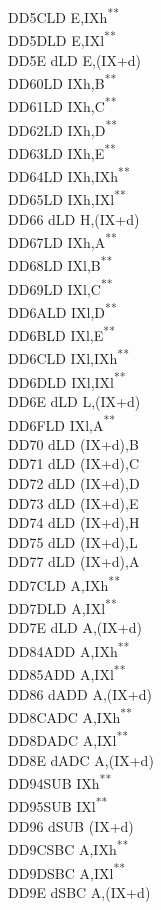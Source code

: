 \documentclass[12pt,twoside,openright,a4paper]{book}
\newcommand{\UNDOC}{\textnormal{\textsuperscript{**}}}
\begin{document}
\begin{multicols}{3}
{\begin{tabbing}
	DD5C\>LD E,IXh\UNDOC\\
	DD5D\>LD E,IXl\UNDOC\\
	DD5E d\>LD E,(IX+d)\\
	DD60\>LD IXh,B\UNDOC\\
	DD61\>LD IXh,C\UNDOC\\
	DD62\>LD IXh,D\UNDOC\\
	DD63\>LD IXh,E\UNDOC\\
	DD64\>LD IXh,IXh\UNDOC\\
	DD65\>LD IXh,IXl\UNDOC\\
	DD66 d\>LD H,(IX+d)\\
	DD67\>LD IXh,A\UNDOC\\
	DD68\>LD IXl,B\UNDOC\\
	DD69\>LD IXl,C\UNDOC\\
	DD6A\>LD IXl,D\UNDOC\\
	DD6B\>LD IXl,E\UNDOC\\
	DD6C\>LD IXl,IXh\UNDOC\\
	DD6D\>LD IXl,IXl\UNDOC\\
	DD6E d\>LD L,(IX+d)\\
	DD6F\>LD IXl,A\UNDOC\\
	DD70 d\>LD (IX+d),B\\
	DD71 d\>LD (IX+d),C\\
	DD72 d\>LD (IX+d),D\\
	DD73 d\>LD (IX+d),E\\
	DD74 d\>LD (IX+d),H\\
	DD75 d\>LD (IX+d),L\\
	DD77 d\>LD (IX+d),A\\
	DD7C\>LD A,IXh\UNDOC\\
	DD7D\>LD A,IXl\UNDOC\\
	DD7E d\>LD A,(IX+d)\\
	DD84\>ADD A,IXh\UNDOC\\
	DD85\>ADD A,IXl\UNDOC\\
	DD86 d\>ADD A,(IX+d)\\
	DD8C\>ADC A,IXh\UNDOC\\
	DD8D\>ADC A,IXl\UNDOC\\
	DD8E d\>ADC A,(IX+d)\\
	DD94\>SUB IXh\UNDOC\\
	DD95\>SUB IXl\UNDOC\\
	DD96 d\>SUB (IX+d)\\
	DD9C\>SBC A,IXh\UNDOC\\
	DD9D\>SBC A,IXl\UNDOC\\
	DD9E d\>SBC A,(IX+d)\\

\end{tabbing}}
\end{multicols}
\end{document}
